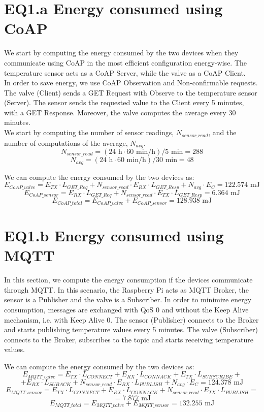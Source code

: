 \section{EQ1.a Energy consumed using CoAP}
We start by computing the energy consumed by the two devices when they communicate using CoAP in the most efficient configuration energy-wise. The temperature sensor acts as a CoAP Server, while the valve as a CoAP Client.\\
In order to save energy, we use CoAP Observation and Non-confirmable requests. The valve (Client) sends a GET Request with Observe to the temperature sensor (Server). The sensor sends the requested value to the Client every 5 minutes, with a GET Response. Moreover, the valve computes the average every 30 minutes.\\
We start by computing the number of sensor readings, $N_{sensor\_read}$, and the number of computations of the average, $N_{avg}$.
\[N_{sensor\_read} = (24\text{ h}  \cdot 60 \text{ min/h}) / 5 \text{ min} = 288\]
\[N_{avg} = (24\text{ h}  \cdot 60 \text{ min/h}) / 30 \text{ min} = 48\]

We can compute the energy consumed by the two devices as:
\[E_{CoAP\_valve} = E_{TX} \cdot L_{GET\_Req} + N_{sensor\_read} \cdot E_{RX} \cdot L_{GET\_Resp} + N_{avg} \cdot E_{C} = 122.574 \text{ mJ}\]
\[E_{CoAP\_sensor} = E_{RX} \cdot L_{GET\_Req} + N_{sensor\_read} \cdot E_{TX} \cdot L_{GET\_Resp} = 6.364 \text{ mJ}\]
\[E_{CoAP\_total} = E_{CoAP\_valve} + E_{CoAP\_sensor} = 128.938 \text{ mJ}\]

\section{EQ1.b Energy consumed using MQTT}
In this section, we compute the energy consumption if the devices communicate through MQTT. In this scenario, the Raspberry Pi acts as MQTT Broker, the sensor is a Publisher and the valve is a Subscriber. In order to minimize energy consumption, messages are exchanged with QoS 0 and without the Keep Alive mechanism, i.e. with Keep Alive 0. The sensor (Publisher) connects to the Broker and starts publishing temperature values every 5 minutes. The valve (Subscriber) connects to the Broker, subscribes to the topic and starts receiving temperature values.

We can compute the energy consumed by the two devices as:
\[E_{MQTT\_valve} = E_{TX} \cdot L_{CONNECT} + E_{RX} \cdot L_{CONNACK} + E_{TX} \cdot L_{SUBSCRIBE} +\]
\[+ E_{RX} \cdot L_{SUBACK} + N_{sensor\_read} \cdot E_{RX} \cdot L_{PUBLISH} + N_{avg} \cdot E_{C} = 124.378 \text{ mJ}\]
\[E_{MQTT\_sensor} = E_{TX} \cdot L_{CONNECT} + E_{RX} \cdot L_{CONNACK} + N_{sensor\_read} \cdot E_{TX} \cdot L_{PUBLISH} =\]
\[= 7.877 \text{ mJ}\]
\[E_{MQTT\_total} = E_{MQTT\_valve} + E_{MQTT\_sensor} = 132.255 \text{ mJ}\]

